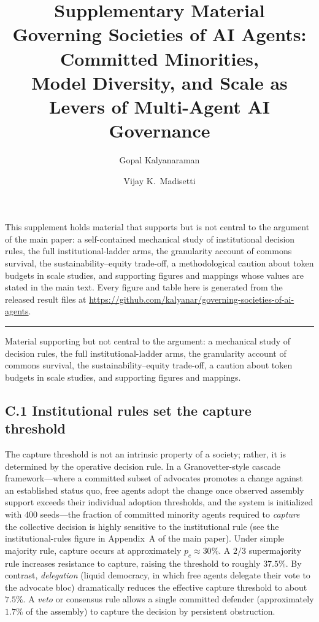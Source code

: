 \documentclass[11pt,a4paper]{article}
\title{\vspace{-2em}\textbf{Supplementary Material}\\[0.3em]
\large Governing Societies of AI Agents: Committed Minorities,\\
Model Diversity, and Scale as Levers of Multi-Agent AI Governance}
\author{Gopal Kalyanaraman \and Vijay K.\ Madisetti}
\date{}
\begin{document}
\maketitle
\vspace{-1.5em}

\noindent
This supplement holds material that supports but is not central to the argument of
the main paper: a self-contained mechanical study of institutional decision rules,
the full institutional-ladder arms, the granularity account of commons survival,
the sustainability--equity trade-off, a methodological caution about token budgets
in scale studies, and supporting figures and mappings whose values are stated in
the main text. Every figure and table here is generated from the released result
files at \url{https://github.com/kalyanar/governing-societies-of-ai-agents}.

\bigskip\hrule\bigskip



Material supporting but not central to the argument: a mechanical study of
decision rules, the full institutional-ladder arms, the granularity account of
commons survival, the sustainability--equity trade-off, a caution about token
budgets in scale studies, and supporting figures and mappings.

\subsection*{C.1 Institutional rules set the capture threshold}
The capture threshold is not an intrinsic property of a society; rather, it is determined by the operative decision rule. In a Granovetter-style cascade framework—where a committed subset of advocates promotes a change against an established status quo, free agents adopt the change once observed assembly support exceeds their individual adoption thresholds, and the system is initialized with $400$ seeds—the fraction of committed minority agents required to \emph{capture} the collective decision is highly sensitive to the institutional rule (see the institutional-rules figure in Appendix~A of the main paper). Under simple majority rule, capture occurs at approximately $p_c \approx 30\%$. A $2/3$ supermajority rule increases resistance to capture, raising the threshold to roughly $37.5\%$. By contrast, \emph{delegation} (liquid democracy, in which free agents delegate their vote to the advocate bloc) dramatically reduces the effective capture threshold to about $7.5\%$. A \emph{veto} or consensus rule allows a single committed defender (approximately $1.7\%$ of the assembly) to capture the decision by persistent obstruction.
\end{document}
